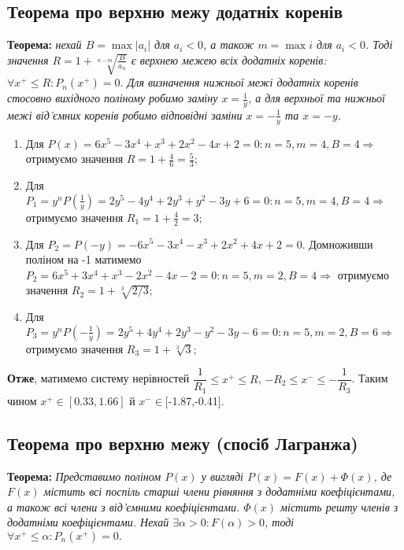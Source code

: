 \documentclass[a4paper,14pt]{extarticle} %
\begin{document}
\subsection{Теорема про верхню межу додатніх коренів}

\textbf{Теорема:} \textit{нехай $B=\max{|a_i|}$ для $a_i<0$, а також 
$m=\max{i}$ для $a_i<0$. Тоді значення $R=1+\sqrt[n-m]{\frac{B}{a_n}}$ 
є верхнею межею всіх додатніх коренів: $\forall{x^{+}}\leqslant R: P_n(x^{+})=0.$
Для визначення нижньої межі додатніх коренів стосовно вихідного поліному 
робимо заміну $x=\frac{1}{y}$, а для верхньої та нижньої межі від'ємних
коренів робимо відповідні заміни $x=-\frac{1}{y}$ та $x=-y$.}

\begin{enumerate}

    \item Для $P(x)=6x^5-3x^4+x^3+2x^2-4x+2=0: n=5,m=4,B=4 \Rightarrow$ \\
    отримуємо значення $R=1+\frac{4}{6}=\frac{5}{3};$
    \item Для $P_1=y^nP(\frac{1}{y})=2y^5-4y^4+2y^3+y^2-3y+6=0: n=5,m=4,B=4 \Rightarrow$ 
    отримуємо значення $R_1=1+\frac{4}{2}=3;$
    \item Для $P_2=P(-y)=-6x^5-3x^4-x^3+2x^2+4x+2=0.$ Домноживши поліном на -1 матимемо
    $P_2=6x^5+3x^4+x^3-2x^2-4x-2=0: n=5,m=2,B=4 \Rightarrow$ 
    отримуємо значення $R_2=1+\sqrt[3]{2/3};$
    \item Для $P_3=y^nP(-\frac{1}{y})=2y^5+4y^4+2y^3-y^2-3y-6=0: n=5,m=2,B=6 \Rightarrow$ 
    отримуємо значення $R_3=1+\sqrt[3]{3};$

\end{enumerate}

\textbf{Отже}, матимемо систему нерівностей $\dfrac{1}{R_1} \leqslant x^{+} \leqslant R$,
 $-R_2 \leqslant x^{-} \leqslant -\dfrac{1}{R_3}$. Таким чином 
$x^{+} \in [0.33,1.66]$ й $x^{-} \in [$-1.87,-0.41].

\subsection{Теорема про верхню межу (спосіб Лагранжа)}

\textbf{Теорема:} \textit{Представимо поліном $P(x)$ у вигляді
$P(x)=F(x)+\Phi (x)$, де $F(x)$ містить всі поспіль старші
члени рівняння з додатніми коефіцієнтами, а також всі члени з від'ємними
коефіцієнтами. $\Phi (x)$ містить решту членів з додатніми коефіцієнтами.
Нехай $\exists \alpha>0: F(\alpha)>0$, тоді $\forall{x^{+}}\leqslant \alpha: P_n(x^{+})=0.$}
\end{document}
